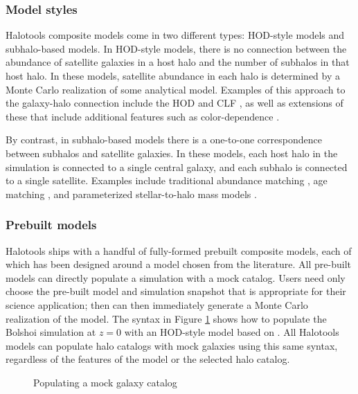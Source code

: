\documentclass[twocolumn, tighten]{aastex6}
\begin{document}
\subsubsection{Model styles}
\label{subsubsection:modelstyles}

Halotools composite models come in two different types: HOD-style models and subhalo-based models. In HOD-style models, there is no connection between the abundance of satellite galaxies in a host halo and the number of subhalos in that host halo. In these models, satellite abundance in each halo is determined by a Monte Carlo realization of some analytical model. Examples of this approach to the galaxy-halo connection include the HOD \citep{berlind02} and CLF \citep{yang03}, as well as extensions of these that include additional features such as color-dependence \citep{tinker_etal13}. 

By contrast, in subhalo-based models there is a one-to-one correspondence between subhalos and satellite galaxies. In these models, each host halo in the simulation is connected to a single central galaxy, and each subhalo is connected to a single satellite. Examples include traditional abundance matching \citep{kravtsov04a,conroy06}, age matching \citep{HW13a}, and parameterized stellar-to-halo mass models  \citep{behroozi10, moster10}.

\subsubsection{Prebuilt models}
\label{subsubsection:prebuiltmodels}

Halotools ships with a handful of fully-formed prebuilt composite models, each of which has been designed around a model chosen from the literature. All pre-built models can directly populate a simulation with a mock catalog. Users need only choose the pre-built model and simulation snapshot that is appropriate for their science application; then can then immediately generate a Monte Carlo realization of the model. The syntax in Figure \ref{code:mockpop} shows how to populate the Bolshoi simulation at $z=0$ with an HOD-style model based on \citet{leauthaud11b}. All Halotools models can populate halo catalogs with mock galaxies using this same syntax, regardless of the features of the model or the selected halo catalog. 
 
 \begin{figure}
\center
\caption{Populating a mock galaxy catalog\label{code:mockpop}}
\vspace{0.1in}
\end{figure}
\end{document}
